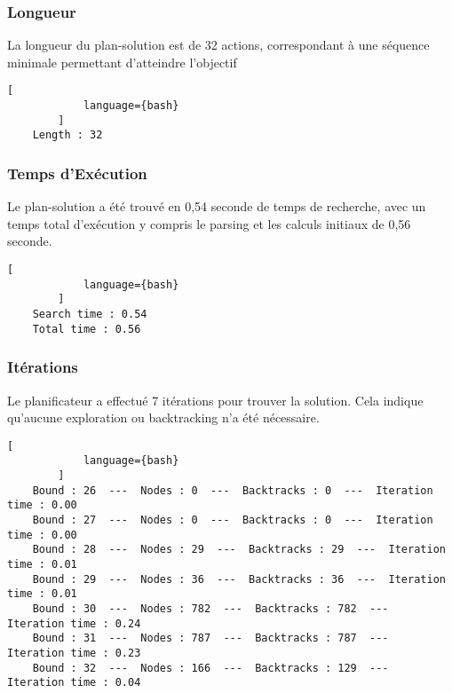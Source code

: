\documentclass[../CSC_5RO16_TA_TP5.tex]{subfiles}
\begin{document}
\subsubsection{Longueur}
\begin{resolution}
    La longueur du plan-solution est de 32 actions, correspondant à une séquence minimale permettant d'atteindre l'objectif

    \begin{scriptsize}\mycode
        \begin{lstlisting}[
            language={bash}
        ]
    Length : 32
        \end{lstlisting}
    \end{scriptsize}
\end{resolution}

\subsubsection{Temps d'Exécution}
\begin{resolution}
    Le plan-solution a été trouvé en 0,54 seconde de temps de recherche, avec un temps total d'exécution y compris le parsing et les calculs initiaux de 0,56 seconde.

    \begin{scriptsize}\mycode
        \begin{lstlisting}[
            language={bash}
        ]
    Search time : 0.54
    Total time : 0.56
        \end{lstlisting}
    \end{scriptsize}
\end{resolution}

\subsubsection{Itérations}
\begin{resolution}
    Le planificateur a effectué 7 itérations pour trouver la solution. Cela indique qu'aucune exploration ou backtracking n'a été nécessaire.

    \begin{scriptsize}\mycode
        \begin{lstlisting}[
            language={bash}
        ]
    Bound : 26  ---  Nodes : 0  ---  Backtracks : 0  ---  Iteration time : 0.00
    Bound : 27  ---  Nodes : 0  ---  Backtracks : 0  ---  Iteration time : 0.00
    Bound : 28  ---  Nodes : 29  ---  Backtracks : 29  ---  Iteration time : 0.01
    Bound : 29  ---  Nodes : 36  ---  Backtracks : 36  ---  Iteration time : 0.01
    Bound : 30  ---  Nodes : 782  ---  Backtracks : 782  ---  Iteration time : 0.24
    Bound : 31  ---  Nodes : 787  ---  Backtracks : 787  ---  Iteration time : 0.23
    Bound : 32  ---  Nodes : 166  ---  Backtracks : 129  ---  Iteration time : 0.04
        \end{lstlisting}
    \end{scriptsize}
\end{resolution}
\end{document}
